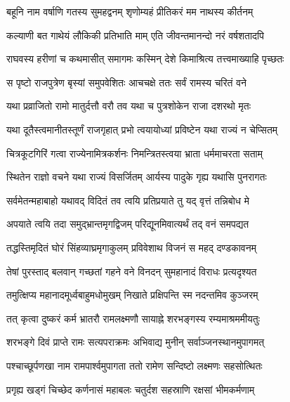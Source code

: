 
\twolineshloka
{बहूनि नाम वर्षाणि गतस्य सुमहद्वनम्}
{शृणोम्यहं प्रीतिकरं मम नाथस्य कीर्तनम्} %

\twolineshloka
{कल्याणी बत गाथेयं लौकिकी प्रतिभाति माम्}
{एति जीवन्तमानन्दो नरं वर्षशतादपि} %

\twolineshloka
{राघवस्य हरीणां च कथमासीत् समागमः}
{कस्मिन् देशे किमाश्रित्य तत्त्वमाख्याहि पृच्छतः} %

\twolineshloka
{स पृष्टो राजपुत्रेण बृस्यां समुपवेशितः}
{आचचक्षे ततः सर्वं रामस्य चरितं वने} %

\twolineshloka
{यथा प्रव्राजितो रामो मातुर्दत्तौ वरौ तव}
{यथा च पुत्रशोकेन राजा दशरथो मृतः} %

\twolineshloka
{यथा दूतैस्त्वमानीतस्तूर्णं राजगृहात् प्रभो}
{त्वयायोध्यां प्रविष्टेन यथा राज्यं न चेप्सितम्} %

\twolineshloka
{चित्रकूटगिरिं गत्वा राज्येनामित्रकर्शनः}
{निमन्त्रितस्त्वया भ्राता धर्ममाचरता सताम्} %

\twolineshloka
{स्थितेन राज्ञो वचने यथा राज्यं विसर्जितम्}
{आर्यस्य पादुके गृह्य यथासि पुनरागतः} %

\twolineshloka
{सर्वमेतन्महाबाहो यथावद् विदितं तव}
{त्वयि प्रतिप्रयाते तु यद् वृत्तं तन्निबोध मे} %

\twolineshloka
{अपयाते त्वयि तदा समुद्भ्रान्तमृगद्विजम्}
{परिद्यूनमिवात्यर्थं तद् वनं समपद्यत} %

\twolineshloka
{तद्धस्तिमृदितं घोरं सिंहव्याघ्रमृगाकुलम्}
{प्रविवेशाथ विजनं स महद् दण्डकावनम्} %

\twolineshloka
{तेषां पुरस्ताद् बलवान् गच्छतां गहने वने}
{विनदन् सुमहानादं विराधः प्रत्यदृश्यत} %

\twolineshloka
{तमुत्क्षिप्य महानादमूर्ध्वबाहुमधोमुखम्}
{निखाते प्रक्षिपन्ति स्म नदन्तमिव कुञ्जरम्} %

\twolineshloka
{तत् कृत्वा दुष्करं कर्म भ्रातरौ रामलक्ष्मणौ}
{सायाह्ने शरभङ्गस्य रम्यमाश्रममीयतुः} %

\twolineshloka
{शरभङ्गे दिवं प्राप्ते रामः सत्यपराक्रमः}
{अभिवाद्य मुनीन् सर्वाञ्जनस्थानमुपागमत्} %

\twolineshloka
{पश्चाच्छूर्पणखा नाम रामपार्श्वमुपागता}
{ततो रामेण सन्दिष्टो लक्ष्मणः सहसोत्थितः} %

\twolineshloka
{प्रगृह्य खड्गं चिच्छेद कर्णनासं महाबलः}
{चतुर्दश सहस्राणि रक्षसां भीमकर्मणाम्} %

